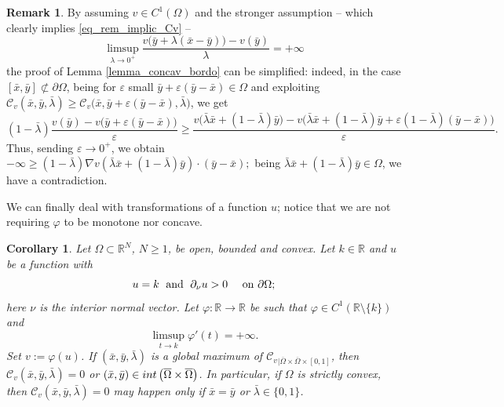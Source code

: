 \documentclass[11pt, reqno]{amsart}
\newtheorem{corollary}[lemma]{Corollary}
\theoremstyle{definition}
\newtheorem{remark}[lemma]{Remark}
\numberwithin{equation}{section}
\newcommand{\R}{\mathbb{R}}
\newcommand{\mc}[1]{\mathcal{#1}}
\def\eps{\varepsilon}
\begin{document}
\begin{remark}
\label{rem_strong_assump_nderiv}
By assuming $v\in C^1(\Omega)$ and the stronger assumption -- which clearly implies \eqref{eq_rem_implic_Cv} -- 
\begin{equation}\label{eq_rem_strong_cond_Cv}
\limsup_{\lambda \to 0^+} \frac{v\big(\bar{y} + \lambda(\bar{x}-\bar{y})\big)-v(\bar{y})}{\lambda} = + \infty 
\end{equation}
the proof of Lemma \ref{lemma_concav_bordo} can be simplified: indeed, in the case $[\bar{x},\bar{y}]\not \subset \partial \Omega$, being for $\eps$ small $\bar{y} + \eps(\bar{y}-\bar{x}) \in \Omega$ and exploiting $\mc{C}_v(\bar{x},\bar{y},\bar{\lambda}) \geq \mc{C}_v\big(\bar{x},\bar{y} + \eps(\bar{y}-\bar{x}), \bar{\lambda}\big)$, we get 
$$(1-\bar{\lambda}) \frac{v(\bar{y})-v\big(\bar{y}+\eps(\bar{y}-\bar{x})\big)}{\eps} \geq \frac{v\big(\bar{\lambda}\bar{x} + (1-\bar{\lambda})\bar{y}\big) - v\big(\bar{\lambda} \bar{x} + (1-\bar{\lambda})\bar{y} + \eps (1-\bar{\lambda})(\bar{y}-\bar{x})\big)}{\eps}.$$
Thus, sending $\eps \to 0^+$, we obtain $- \infty \geq (1-\bar{\lambda})\nabla v(\bar{\lambda}\bar{x} + (1-\bar{\lambda})\bar{y}) \cdot (\bar{y}-\bar{x});$
being $\bar{\lambda}\bar{x} + (1-\bar{\lambda})\bar{y} \in \Omega$, we have a contradiction.
\end{remark}

We can finally deal with transformations of a function $u$; notice that we are not requiring $\varphi$ to be monotone nor concave.

\begin{corollary}
\label{corol_concav_bounda}
Let $\Omega \subset\R^N$, $N\geq 1$, be open, bounded and convex. 
Let $k \in \R$ and $u$ be a function with 
$$u=k \; \hbox{ and } \; \partial_{\nu} u>0 \quad \hbox{ on $\partial \Omega$};$$
here $\nu$ is the interior normal vector. 
Let $\varphi: \R \to \R$ be such that $\varphi \in C^1(\R \setminus \{k\})$ and
$$\limsup_{t \to k} \varphi'(t)= + \infty.$$ 
Set $v:= \varphi(u)$. 
If $(\bar{x},\bar{y}, \bar{\lambda})$ is a global maximum of $\mc{C}_v$$_{|\overline{\Omega} \times \overline{\Omega} \times [0,1]}$, then $\mc{C}_v(\bar{x},\bar{y}, \bar{\lambda})=0$ or $(\bar{x},\bar{y}) \in \textup{int}\left(\overline{\Omega} \times \overline{\Omega}\right)$.
In particular, if $\Omega$ is strictly convex, then $\mc{C}_v(\bar{x},\bar{y}, \bar{\lambda})=0$ may happen only if $\bar{x}=\bar{y}$ or $\bar{\lambda} \in \{0,1\}$.
\end{corollary}
\end{document}
